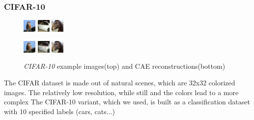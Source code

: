 \documentclass[draft]{article}
\begin{document}
    \subsubsection{CIFAR-10}
    	\begin{figure}[h]
        \centering
        \includegraphics[width=0.2\linewidth]{../graphics/reconstructions/cifar/input_00.png}
        \includegraphics[width=0.2\linewidth]{../graphics/reconstructions/cifar/input_01.png}
        \includegraphics[width=0.2\linewidth]{../graphics/reconstructions/cifar/input_02.png}

        \includegraphics[width=0.2\linewidth]{../graphics/reconstructions/cifar/reconstruction_00.png}
        \includegraphics[width=0.2\linewidth]{../graphics/reconstructions/cifar/reconstruction_01.png}
        \includegraphics[width=0.2\linewidth]{../graphics/reconstructions/cifar/reconstruction_02.png}

        \caption{\emph{CIFAR-10} example images(top) and CAE reconstructions(bottom)}

      \end{figure}
      The CIFAR dataset \citep{krizhevsky2009learning} is made out of natural scenes, which are 32x32 colorized images. The relatively low resolution, while still and the colors lead to a more complex
      The CIFAR-10 variant, which we used, is built as a classification dataset with 10 specified labels (cars, cats...)
\end{document}

